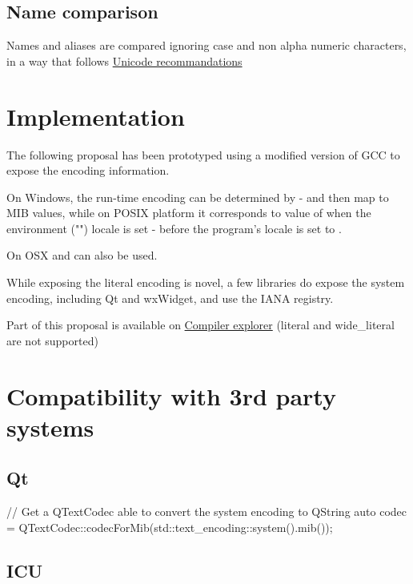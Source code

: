\documentclass{wg21}
\begin{document}
\subsection{Name comparison}

Names and aliases are compared ignoring case and non alpha numeric characters, in a way that follows 
\href{https://www.unicode.org/reports/tr22/tr22-8.html#Charset_Alias_Matching}{Unicode recommandations}

\section{Implementation}

The following proposal has been prototyped using a modified version of GCC to expose the encoding information.

On Windows, the run-time encoding can be determined by  - and then map to MIB values, while on POSIX platform it corresponds to value of  when the environment ("") locale is set - before the program's locale is set to .

On OSX  and  can also be used.


While exposing the literal encoding is novel, a few libraries do expose the system encoding, including Qt and wxWidget, and use the IANA registry.

Part of this proposal is available on \href{https://compiler-explorer.com/z/7D3Z3x}{Compiler explorer}
(literal and wide_literal are not supported)


\section{Compatibility with 3rd party systems}

\subsection{Qt}

\begin{colorblock}
// Get a QTextCodec able to convert the system encoding to QString
auto codec = QTextCodec::codecForMib(std::text_encoding::system().mib());
\end{colorblock}

\subsection{ICU}
\end{document}
